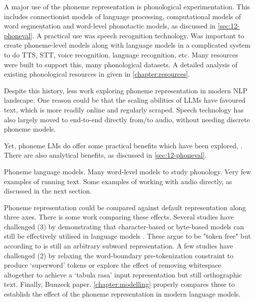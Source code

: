 A major use of the phoneme representation is phonological experimentation. This includes connectionist models of language processing, computational models of word segmentation and word-level phonotactic models, as discussed in \cref{sec:12-phoneval}. A practical use was speech recognition technology. Was important to create phoneme-level models along with language models in a complicated system to do TTS, STT, voice recognition, language recognition, etc. Many resources were built to support this, many phonological datasets. A detailed analysis of existing phonological resources in given in \cref{chapter:resources}.

Despite this history, less work exploring phoneme representation in modern NLP landscape. One reason could be that the scaling abilities of LLMs have favoured text, which is more readily online and regularly scraped. Speech technology has also largely moved to end-to-end directly from/to audio, without needing discrete phoneme models.

Yet, phoneme LMs do offer some practical benefits which have been explored, \writemore. There are also analytical benefits, as discussed in \cref{sec:12-phoneval}.


Phoneme language models. Many word-level models to study phonology. Very few examples of running text. Some examples of working with audio directly, as discussed in the next section.

Phoneme representation could be compared against default representation along three axes. There is some work comparing these effects. Several studies have challenged (3) by demonstrating that character-based or byte-based models can still be effectively utilised in language models \addcites. These argue to be "token free" but according to \addcites is still an arbitrary subword representation. A few studies have challenged (2) by relaxing the word-boundary pre-tokenization constraint to produce `superword' tokens \addcites or explore the effect of removing whitespace altogether to achieve a `tabula rasa' input representation \addcites but still orthographic text. Finally, Bunzeck paper. \cref{chapter:modelling} properly compares these to establish the effect of the phoneme representation in modern language models.

